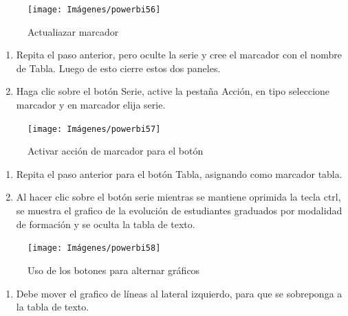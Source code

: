 \documentclass[
]{book}
\providecommand{\tightlist}{%
  \setlength{\itemsep}{0pt}\setlength{\parskip}{0pt}}
\begin{document}
\begin{figure}

{\centering \texttt{[image: Imágenes/powerbi56]} 

}

\caption{Actualiazar marcador}\label{fig:paso9alternancia-fig}
\end{figure}

\begin{enumerate}
\def\labelenumi{\arabic{enumi}.}
\setcounter{enumi}{9}
\item
  Repita el paso anterior, pero oculte la serie y cree el marcador con el nombre de Tabla. Luego de esto cierre estos dos paneles.
\item
  Haga clic sobre el botón Serie, active la pestaña Acción, en tipo seleccione marcador y en marcador elija serie.
\end{enumerate}

\begin{figure}

{\centering \texttt{[image: Imágenes/powerbi57]} 

}

\caption{Activar acción de marcador para el botón}\label{fig:paso11alternancia-fig}
\end{figure}

\begin{enumerate}
\def\labelenumi{\arabic{enumi}.}
\setcounter{enumi}{11}
\item
  Repita el paso anterior para el botón Tabla, asignando como marcador tabla.
\item
  Al hacer clic sobre el botón serie mientras se mantiene oprimida la tecla ctrl, se muestra el grafico de la evolución de estudiantes graduados por modalidad de formación y se oculta la tabla de texto.
\end{enumerate}

\begin{figure}

{\centering \texttt{[image: Imágenes/powerbi58]} 

}

\caption{Uso de los botones para alternar gráficos}\label{fig:paso13alternancia-fig}
\end{figure}

\begin{enumerate}
\def\labelenumi{\arabic{enumi}.}
\setcounter{enumi}{13}
\tightlist
\item
  Debe mover el grafico de líneas al lateral izquierdo, para que se sobreponga a la tabla de texto.
\end{enumerate}
\end{document}
